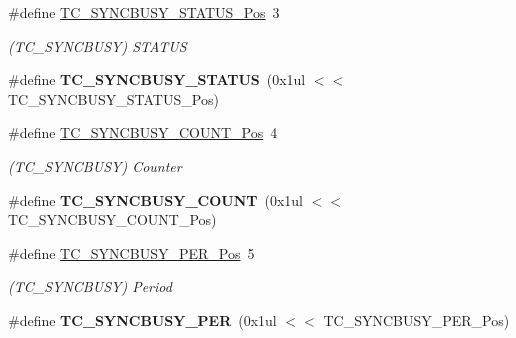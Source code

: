 \begin{DoxyCompactItemize}
\item 
\hypertarget{group___s_a_m_l21___t_c_ga864d68a5d10ecef4692786eb85a0d871}{}\#define \hyperlink{group___s_a_m_l21___t_c_ga864d68a5d10ecef4692786eb85a0d871}{T\+C\+\_\+\+S\+Y\+N\+C\+B\+U\+S\+Y\+\_\+\+S\+T\+A\+T\+U\+S\+\_\+\+Pos}~3\label{group___s_a_m_l21___t_c_ga864d68a5d10ecef4692786eb85a0d871}

\begin{DoxyCompactList}\small\item\em (T\+C\+\_\+\+S\+Y\+N\+C\+B\+U\+S\+Y) S\+T\+A\+T\+U\+S \end{DoxyCompactList}\item 
\hypertarget{group___s_a_m_l21___t_c_ga1435318d44e80f893aef21689867bf57}{}\#define {\bfseries T\+C\+\_\+\+S\+Y\+N\+C\+B\+U\+S\+Y\+\_\+\+S\+T\+A\+T\+U\+S}~(0x1ul $<$$<$ T\+C\+\_\+\+S\+Y\+N\+C\+B\+U\+S\+Y\+\_\+\+S\+T\+A\+T\+U\+S\+\_\+\+Pos)\label{group___s_a_m_l21___t_c_ga1435318d44e80f893aef21689867bf57}

\item 
\hypertarget{group___s_a_m_l21___t_c_ga4542f91f9328e6f795dc6611db8067d2}{}\#define \hyperlink{group___s_a_m_l21___t_c_ga4542f91f9328e6f795dc6611db8067d2}{T\+C\+\_\+\+S\+Y\+N\+C\+B\+U\+S\+Y\+\_\+\+C\+O\+U\+N\+T\+\_\+\+Pos}~4\label{group___s_a_m_l21___t_c_ga4542f91f9328e6f795dc6611db8067d2}

\begin{DoxyCompactList}\small\item\em (T\+C\+\_\+\+S\+Y\+N\+C\+B\+U\+S\+Y) Counter \end{DoxyCompactList}\item 
\hypertarget{group___s_a_m_l21___t_c_gad8291e3ab76b665226289d8c86252241}{}\#define {\bfseries T\+C\+\_\+\+S\+Y\+N\+C\+B\+U\+S\+Y\+\_\+\+C\+O\+U\+N\+T}~(0x1ul $<$$<$ T\+C\+\_\+\+S\+Y\+N\+C\+B\+U\+S\+Y\+\_\+\+C\+O\+U\+N\+T\+\_\+\+Pos)\label{group___s_a_m_l21___t_c_gad8291e3ab76b665226289d8c86252241}

\item 
\hypertarget{group___s_a_m_l21___t_c_ga8e5b9a8180bd8f9ab5e9e2048b57c0df}{}\#define \hyperlink{group___s_a_m_l21___t_c_ga8e5b9a8180bd8f9ab5e9e2048b57c0df}{T\+C\+\_\+\+S\+Y\+N\+C\+B\+U\+S\+Y\+\_\+\+P\+E\+R\+\_\+\+Pos}~5\label{group___s_a_m_l21___t_c_ga8e5b9a8180bd8f9ab5e9e2048b57c0df}

\begin{DoxyCompactList}\small\item\em (T\+C\+\_\+\+S\+Y\+N\+C\+B\+U\+S\+Y) Period \end{DoxyCompactList}\item 
\hypertarget{group___s_a_m_l21___t_c_gab7e8468c2c68f79e5597706bbe376ab7}{}\#define {\bfseries T\+C\+\_\+\+S\+Y\+N\+C\+B\+U\+S\+Y\+\_\+\+P\+E\+R}~(0x1ul $<$$<$ T\+C\+\_\+\+S\+Y\+N\+C\+B\+U\+S\+Y\+\_\+\+P\+E\+R\+\_\+\+Pos)\label{group___s_a_m_l21___t_c_gab7e8468c2c68f79e5597706bbe376ab7}


\end{DoxyCompactItemize}
